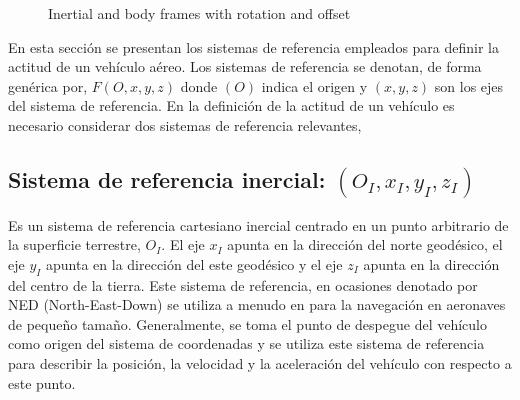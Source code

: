 \documentclass[a4paper,12pt]{book}
\begin{document}
\begin{figure}[h]
\centering
\caption{Inertial and body frames with rotation and offset}
\end{figure}

En esta sección se presentan los sistemas de referencia empleados para definir la actitud de un vehículo aéreo. Los sistemas de referencia se denotan, de forma genérica por, $F(O,x,y,z)$ donde $(O)$ indica el origen y $(x,y,z)$ son los ejes del sistema de referencia. En la definición de la actitud de un vehículo es necesario considerar dos sistemas de referencia relevantes,

\subsection{Sistema de referencia inercial: $(O_I, x_I, y_I, z_I)$}

Es un sistema de referencia cartesiano inercial centrado en un punto arbitrario de la superficie terrestre, $O_I$. El eje $x_I$ apunta en la dirección del norte geodésico, el eje $y_I$ apunta en la dirección del este geodésico y el eje $z_I$ apunta en la dirección del centro de la tierra. Este sistema de referencia, en ocasiones denotado por NED (North-East-Down) se utiliza a menudo en para la navegación en aeronaves de pequeño tamaño. Generalmente, se toma el punto de despegue del vehículo como origen del sistema de coordenadas y se utiliza este sistema de referencia para describir la posición, la velocidad y la aceleración del vehículo con respecto a este punto.
\end{document}
